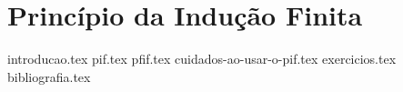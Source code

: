 \chapter{Princípio da Indução Finita}
{
    \newcommand{\chapterdir}{../capitulos/principio-da-inducao-finita/}

    {introducao.tex}
    {pif.tex}
    {pfif.tex}
    {cuidados-ao-usar-o-pif.tex}
    {exercicios.tex}
    {bibliografia.tex}
}
